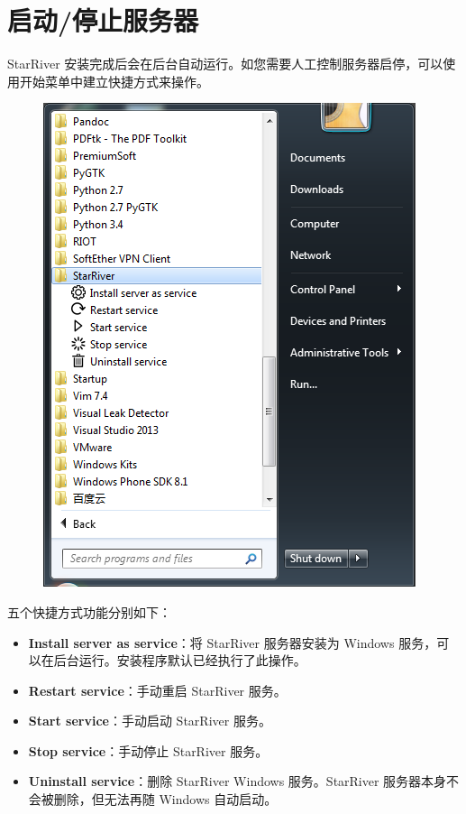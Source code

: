 \section{启动/停止服务器}\label{ux542fux52a8ux505cux6b62ux670dux52a1ux5668}

StarRiver
安装完成后会在后台自动运行。如您需要人工控制服务器启停，可以使用开始菜单中建立快捷方式来操作。

\begin{figure}[htbp]
\centering
\includegraphics{../img/shortcuts.png}
\end{figure}

五个快捷方式功能分别如下：

\begin{itemize}
\itemsep1pt\parskip0pt
\item
  \textbf{Install server as service}：将 StarRiver 服务器安装为 Windows
  服务，可以在后台运行。安装程序默认已经执行了此操作。
\item
  \textbf{Restart service}：手动重启 StarRiver 服务。
\item
  \textbf{Start service}：手动启动 StarRiver 服务。
\item
  \textbf{Stop service}：手动停止 StarRiver 服务。
\item
  \textbf{Uninstall service}：删除 StarRiver Windows 服务。StarRiver
  服务器本身不会被删除，但无法再随 Windows 自动启动。
\end{itemize}
